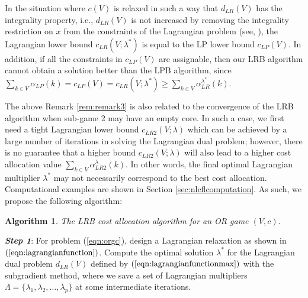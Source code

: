 \documentclass[ijoc,nonblindrev]{informs3} %
\newtheorem{algorithm}{Algorithm}
\begin{document}
\begin{remark}\label{rem:remark4-thm2}
In the situation where $c(V)$ is relaxed in such a way that $d_{LR}(V)$ has the integrality property, i.e., $d_{LR}(V)$ is not increased by removing the integrality restriction on $x$ from the constraints of the Lagrangian problem (see, \citealt{Geoffrion}), the Lagrangian lower bound $c_{LR}(V;\lambda^*)$ is equal to the LP lower bound $c_{LP}(V)$.
In addition, if all the constraints in $c_{LP}(V)$ are assignable, then our LRB algorithm cannot obtain a solution better than the LPB algorithm, since $\sum_{k \in V}\alpha_{LP}(k) = c_{LP}(V) = c_{LR}(V;\lambda^*) \geq \sum_{k \in V} \alpha_{LR}^{\lambda^*}(k) $.
\end{remark}


The above Remark \ref{rem:remark3} is also related to the convergence of the LRB algorithm when sub-game 2 may have an empty core. In such a case,  we first need a  tight Lagrangian lower bound $c_{LR2}(V;\lambda)$ which can be achieved by a large number of iterations in solving the Lagrangian dual problem; however, there is no guarantee  that a higher bound $c_{LR2}(V;\lambda)$ will also lead to a higher cost allocation value $ \sum_{k \in V} \alpha_{LR2}^{\lambda}(k)$. In other words, the final optimal Lagrangian multiplier $\lambda^*$ may not necessarily correspond to the best cost allocation. Computational examples are shown in Section \ref{sec:nlcflcomputation}. As such, we propose the following algorithm:


\begin{algorithm}\label{algolrb}
The LRB cost allocation algorithm for an OR game $(V,c)$.
\end{algorithm}

\textbf{{\em Step 1}}: For problem (\ref{eqn:orgc}), design a Lagrangian relaxation as shown in $(\ref{eqn:lagrangianfunction})$. Compute the optimal solution $\lambda^*$ for the Lagrangian dual problem $d_{LR}(V)$ defined by $(\ref{eqn:lagrangianfunctionmax})$ with the subgradient method, where we  save a set of Lagrangian multipliers $\Lambda=\{\lambda_1,\lambda_2,\ldots,\lambda_p\}$ at some intermediate iterations. %
\end{document}

